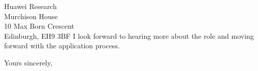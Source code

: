 \documentclass[11pt]{letter} %
\begin{document}
\begin{letter}{ Huawei Research \\
Murchison House \\
10 Max Born Crescent \\
Edinburgh, EH9 3BF}
I look forward to hearing more about the role and moving forward with the
application process.

\closing{Yours sincerely,}




\end{letter}

\vfill
\end{document}
